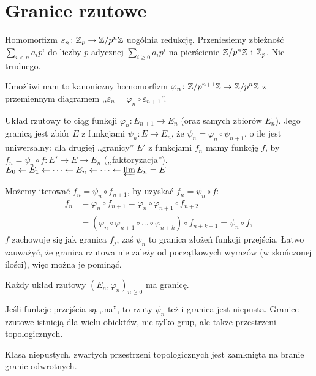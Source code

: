 \section{Granice rzutowe}
Homomorfizm $\varepsilon_n \colon \mathbb Z_p \to \mathbb Z/p^n\mathbb Z$ uogólnia redukcję.
Przeniesiemy zbieżność $\sum_{i < n} a_ip^i$ do liczby $p$-adycznej $\sum_{i \ge 0} a_i p^i$ na pierścienie $\mathbb Z/p^n\mathbb Z$ i $\mathbb Z_p$.
Nic trudnego.

Umożliwi nam to kanoniczny homomorfizm $\varphi_n \colon \mathbb Z/p^{n+1} \mathbb Z \to \mathbb Z / p^n \mathbb Z$ z przemiennym diagramem ,,$\varepsilon_n = \varphi_n \circ \varepsilon_{n+1}$''.

\begin{definicja}
	Układ rzutowy to ciąg funkcji $\varphi_n \colon E_{n+1} \to E_n$ (oraz samych zbiorów $E_n$). 
	Jego granicą jest zbiór $E$ z funkcjami $\psi_n \colon E \to E_n$, że $\psi_n = \varphi_n \circ \psi_{n+1}$, o ile jest uniwersalny: dla drugiej ,,granicy'' $E'$ z funkcjami $f_n$ mamy funkcję $f$, by $f_n = \psi_n \circ f \colon E' \to E \to E_n$ (,,faktoryzacja'').
	$E_0 \leftarrow E_1 \leftarrow \dots \leftarrow E_n \leftarrow \dots \leftarrow \varprojlim E_n = E$
\end{definicja}

Możemy iterować $f_n = \psi_n \circ f_{n+1}$, by uzyskać $f_n = \psi_n \circ f$:
\begin{align*}
	f_n & = \varphi_n \circ f_{n+1} = \varphi_n \circ \varphi_{n+1} \circ f_{n+2} \\
	& = (\varphi_n \circ \varphi_{n+1} \circ \ldots \circ \varphi_{n+k}) \circ f_{n+k+1} = \psi_n \circ f,
\end{align*}
$f$ zachowuje się jak granica $f_j$, zaś $\psi_n$ to granica złożeń funkcji przejścia.
Łatwo zauważyć, że granica rzutowa nie zależy od początkowych wyrazów (w skończonej ilości), więc można je pominąć.

\begin{fakt}
	Każdy układ rzutowy $(E_n, \varphi_n)_{n \ge 0}$ ma granicę.
\end{fakt}

Jeśli funkcje przejścia są ,,na'', to rzuty $\psi_n$ też i granica jest niepusta.
Granice rzutowe istnieją dla wielu obiektów, nie tylko grup, ale także przestrzeni topologicznych.

\begin{fakt}
	Klasa niepustych, zwartych przestrzeni topologicznych jest zamknięta na branie granic odwrotnych.
\end{fakt}

